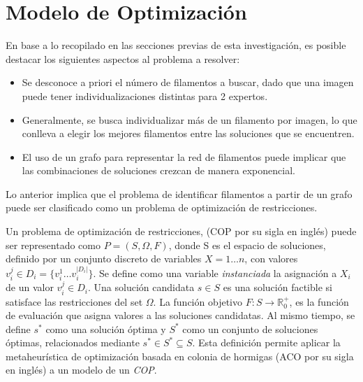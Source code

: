 \chapter{Modelo de Optimización}
\label{sec:modeloOpti}

En base a lo recopilado en las secciones previas de esta investigaci\'on, es posible destacar los siguientes aspectos al problema a resolver:

\begin{itemize}
    \item Se desconoce a priori el n\'umero de filamentos a buscar, dado que una imagen puede tener individualizaciones distintas para 2 expertos.
    \item Generalmente, se busca individualizar m\'as de un filamento por imagen, lo que conlleva a elegir los mejores filamentos entre las soluciones que se encuentren.
    \item El uso de un grafo para representar la red de filamentos puede implicar que las combinaciones de soluciones crezcan de manera exponencial.
\end{itemize}

Lo anterior implica que el problema de identificar filamentos a partir de un grafo puede ser clasificado como un problema de optimizaci\'on de restricciones\cite{blum2011hybrid}.

Un problema de optimización de restricciones, (COP por su sigla en ingl\'es) puede ser representado como $P = (S, \Omega, F)$, donde S es el espacio de soluciones, definido por un conjunto discreto de variables $X = 1 \dotsc n$, con valores $v_{i}^{j} \in D_{i} = \{v_{i}^{1} \dotsc  v_{i}^{|D_{i}|}\}$. Se define como una variable {\it instanciada} la asignaci\'on a $X_i$ de un valor $v_{i}^{j} \in D_i$. Una solución candidata $s \in S$ es una soluci\'on factible si satisface las restricciones del set $\Omega$. La funci\'on objetivo $F: S\rightarrow \mathbb R_{0}^{+}$, es la funci\'on de evaluaci\'on que asigna valores a las soluciones candidatas. Al mismo tiempo, se define $s^{*}$ como una soluci\'on \'optima y $S^{*}$ como un conjunto de soluciones \'optimas, relacionados mediante $s^{*} \in S^{*} \subseteq S $\cite{socha2008ant}.
Esta definici\'on permite aplicar la metaheur\'istica de optimizaci\'on basada en colonia de hormigas (ACO por su sigla en ingl\'es) a un modelo de un {\it COP}.

